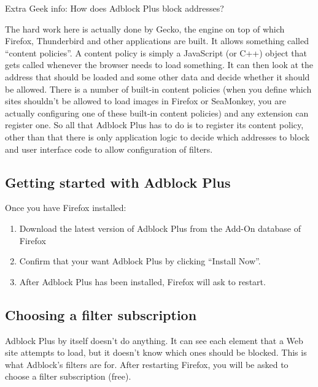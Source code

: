 Extra Geek info: How does Adblock Plus block addresses?

The hard work here is actually done by Gecko, the engine on top of which
Firefox, Thunderbird and other applications are built. It allows
something called ``content policies''. A content policy is simply a
JavaScript (or C++) object that gets called whenever the browser needs
to load something. It can then look at the address that should be loaded
and some other data and decide whether it should be allowed. There is a
number of built-in content policies (when you define which sites
shouldn't be allowed to load images in Firefox or SeaMonkey, you are
actually configuring one of these built-in content policies) and any
extension can register one. So all that Adblock Plus has to do is to
register its content policy, other than that there is only application
logic to decide which addresses to block and user interface code to
allow configuration of filters.

\subsection{Getting started with Adblock Plus}

Once you have Firefox installed:

\begin{enumerate}[1.]
\item
  Download the latest version of Adblock Plus from the Add-On database
  of Firefox
\item
  Confirm that your want Adblock Plus by clicking ``Install Now''.
\item
  After Adblock Plus has been installed, Firefox will ask to restart.
\end{enumerate}
\subsection{Choosing a filter subscription}

Adblock Plus by itself doesn't do anything. It can see each element that
a Web site attempts to load, but it doesn't know which ones should be
blocked. This is what Adblock's filters are for. After restarting
Firefox, you will be asked to choose a filter subscription (free).

